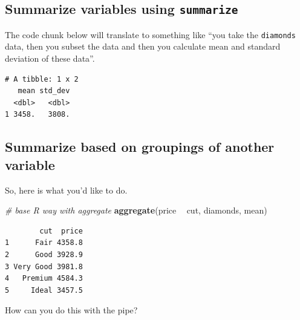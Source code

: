 \documentclass[
]{book}
\newenvironment{Shaded}{\begin{snugshade}}{\end{snugshade}}
\newcommand{\CommentTok}[1]{\textcolor[rgb]{0.56,0.35,0.01}{\textit{#1}}}
\newcommand{\DataTypeTok}[1]{\textcolor[rgb]{0.13,0.29,0.53}{#1}}
\newcommand{\KeywordTok}[1]{\textcolor[rgb]{0.13,0.29,0.53}{\textbf{#1}}}
\newcommand{\NormalTok}[1]{#1}
\newcommand{\OperatorTok}[1]{\textcolor[rgb]{0.81,0.36,0.00}{\textbf{#1}}}
\newcommand{\StringTok}[1]{\textcolor[rgb]{0.31,0.60,0.02}{#1}}
\begin{document}
\hypertarget{summarize-variables-using-summarize}{%
\subsection{\texorpdfstring{Summarize variables using \texttt{summarize}}{Summarize variables using summarize}}\label{summarize-variables-using-summarize}}

The code chunk below will translate to something like ``you take the \texttt{diamonds} data, then you subset the data and then you calculate mean and standard deviation of these data''.

\begin{Shaded}
\end{Shaded}

\begin{verbatim}
# A tibble: 1 x 2
   mean std_dev
  <dbl>   <dbl>
1 3458.   3808.
\end{verbatim}

\hypertarget{summarize-based-on-groupings-of-another-variable}{%
\subsection{Summarize based on groupings of another variable}\label{summarize-based-on-groupings-of-another-variable}}

So, here is what you'd like to do.

\begin{Shaded}
\begin{Highlighting}[]
\CommentTok{# base R way with aggregate}
\KeywordTok{aggregate}\NormalTok{(price }\OperatorTok{~}\StringTok{ }\NormalTok{cut, diamonds, mean)}
\end{Highlighting}
\end{Shaded}

\begin{verbatim}
        cut  price
1      Fair 4358.8
2      Good 3928.9
3 Very Good 3981.8
4   Premium 4584.3
5     Ideal 3457.5
\end{verbatim}

How can you do this with the pipe?
\end{document}

